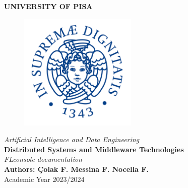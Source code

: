 \begin{titlepage}
    \centering
    \vspace*{\fill}
    {\LARGE \textbf{UNIVERSITY OF PISA}}\\[0.5cm]
    \begin{figure}[h]
        \centering
        \includegraphics[width=0.5\textwidth]{images/universita-di-pisa-logo.png} 
    \end{figure}
    {\Large \textit{Artificial Intelligence and Data Engineering}}\\[1.5cm]
    {\LARGE \textbf{Distributed Systems and Middleware Technologies}}\\[1cm]
    {\Large \textit{FLconsole documentation}}\\[8cm]
    {\large \textbf{Authors: Çolak F. Messina F. Nocella F.}}\\[0.5cm]
    {\large Academic Year 2023/2024}
    \vspace*{\fill}
\end{titlepage}
